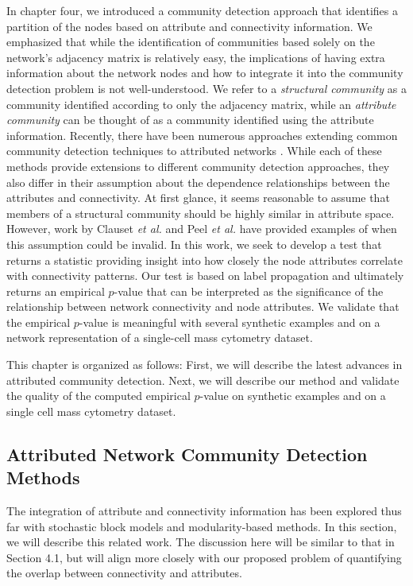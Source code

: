 In chapter four, we introduced a community detection approach that identifies a partition of the nodes based on attribute and connectivity information. We emphasized that while the identification of communities based solely on the network's adjacency matrix is relatively easy, the implications of having extra information about the network nodes and how to integrate it into the community detection problem is not well-understood. We refer to a \emph{structural community} as a community identified according to only the adjacency matrix, while an \emph{attribute community} can be thought of as a community identified using the attribute information. Recently, there have been numerous approaches extending common community detection techniques to attributed networks \cite{hric,peel2017ground,ilouvain,cesna,clauset,perozziAttribute}. While each of these methods provide extensions to different community detection approaches, they also differ in their assumption about the dependence relationships between the attributes and connectivity. At first glance, it seems reasonable to assume that members of a structural community should be highly similar in attribute space. However, work by Clauset \emph{et al.} \cite{clauset} and Peel \emph{et al.} \cite{peel2017ground} have provided examples of when this assumption could be invalid. In this work, we seek to develop a test that returns a statistic providing insight into how closely the node attributes correlate with connectivity patterns. Our test is based on label propagation and ultimately returns an empirical $p$-value that can be interpreted as the significance of the relationship between network connectivity and node attributes. We validate that the empirical $p$-value is meaningful with several synthetic examples and on a network representation of a single-cell mass cytometry dataset. 

This chapter is organized as follows: First, we will describe the latest advances in attributed community detection. Next, we will describe our method and validate the quality of the computed empirical $p$-value on synthetic examples and on a single cell mass cytometry dataset. 

\subsection{Attributed Network Community Detection Methods}
The integration of attribute and connectivity information has been explored thus far with stochastic block models and modularity-based methods. In this section, we will describe this related work. The discussion here will be similar to that in Section 4.1, but will align more closely with our proposed problem of quantifying the overlap between connectivity and attributes.  

